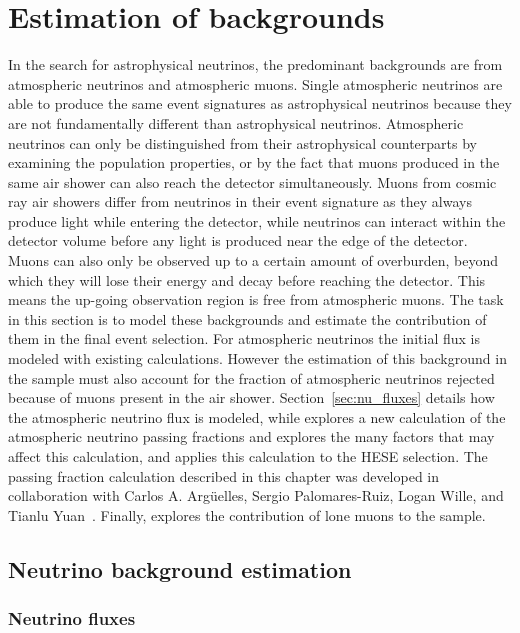 \chapter{Estimation of backgrounds}\label{chapter:backgrounds}\label{sec:background_estimation}

In the search for astrophysical neutrinos, the predominant backgrounds are from atmospheric neutrinos and atmospheric muons.
Single atmospheric neutrinos are able to produce the same event signatures as astrophysical neutrinos because they are not fundamentally different than astrophysical neutrinos.
Atmospheric neutrinos can only be distinguished from their astrophysical counterparts by examining the population properties, or by the fact that muons produced in the same air shower can also reach the detector simultaneously.
Muons from cosmic ray air showers differ from neutrinos in their event signature as they always produce light while entering the detector, while neutrinos can interact within the detector volume before any light is produced near the edge of the detector.
Muons can also only be observed up to a certain amount of overburden, beyond which they will lose their energy and decay before reaching the detector.
This means the up-going observation region is free from atmospheric muons.
The task in this section is to model these backgrounds and estimate the contribution of them in the final event selection.
For atmospheric neutrinos the initial flux is modeled with existing calculations.
However the estimation of this background in the sample must also account for the fraction of atmospheric neutrinos rejected because of muons present in the air shower.
Section~\ref{sec:nu_fluxes} details how the atmospheric neutrino flux is modeled, while  explores a new calculation of the atmospheric neutrino passing fractions and explores the many factors that may affect this calculation, and  applies this calculation to the HESE selection.
The passing fraction calculation described in this chapter was developed in collaboration with Carlos A. Argüelles, Sergio Palomares-Ruiz, Logan Wille, and Tianlu Yuan~\cite{Arguelles:2018awr}.
Finally,  explores the contribution of lone muons to the sample.

\section{Neutrino background estimation}
\subsection{Neutrino fluxes\label{sec:nu_fluxes}}

